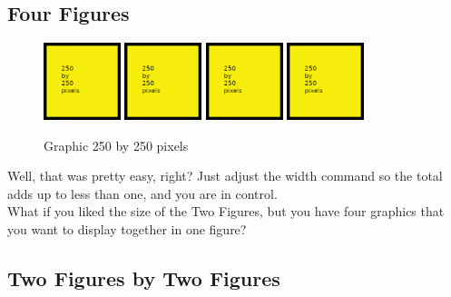 \subsection*{Four Figures}

\begin{figure}[H]
\centering
\includegraphics[width=0.2\textwidth]{250x250}
\includegraphics[width=0.2\textwidth]{250x250}
\includegraphics[width=0.2\textwidth]{250x250}
\includegraphics[width=0.2\textwidth]{250x250}
\caption{Graphic 250 by 250 pixels}\label{fg:250x250-5}
\end{figure}

Well, that was pretty easy, right?  Just adjust the width command so the total adds up to less than one, and you are in control.\\

What if you liked the size of the Two Figures, but you have four graphics that you want to display together in one figure?

\newpage

\subsection*{Two Figures by Two Figures}

